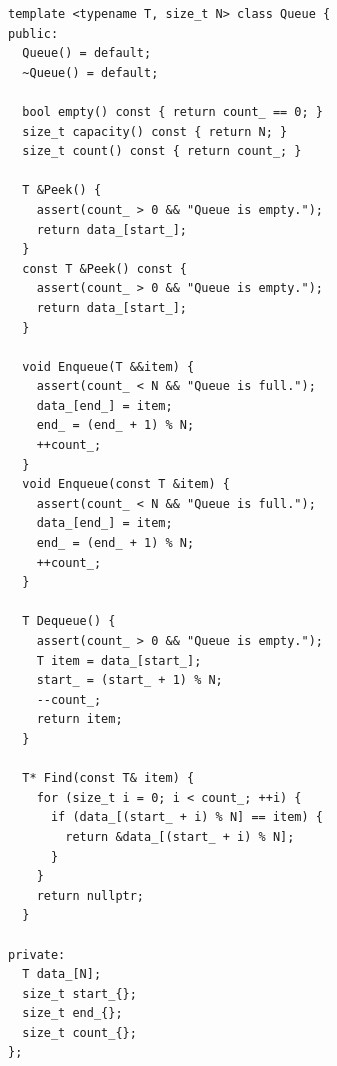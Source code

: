\begin{verbatim}
template <typename T, size_t N> class Queue {
public:
  Queue() = default;
  ~Queue() = default;

  bool empty() const { return count_ == 0; }
  size_t capacity() const { return N; }
  size_t count() const { return count_; }

  T &Peek() {
    assert(count_ > 0 && "Queue is empty.");
    return data_[start_];
  }
  const T &Peek() const {
    assert(count_ > 0 && "Queue is empty.");
    return data_[start_];
  }

  void Enqueue(T &&item) {
    assert(count_ < N && "Queue is full.");
    data_[end_] = item;
    end_ = (end_ + 1) % N;
    ++count_;
  }
  void Enqueue(const T &item) {
    assert(count_ < N && "Queue is full.");
    data_[end_] = item;
    end_ = (end_ + 1) % N;
    ++count_;
  }

  T Dequeue() {
    assert(count_ > 0 && "Queue is empty.");
    T item = data_[start_];
    start_ = (start_ + 1) % N;
    --count_;
    return item;
  }

  T* Find(const T& item) {
    for (size_t i = 0; i < count_; ++i) {
      if (data_[(start_ + i) % N] == item) {
        return &data_[(start_ + i) % N];
      }
    }
    return nullptr;
  }

private:
  T data_[N];
  size_t start_{};
  size_t end_{};
  size_t count_{};
};
\end{verbatim}
